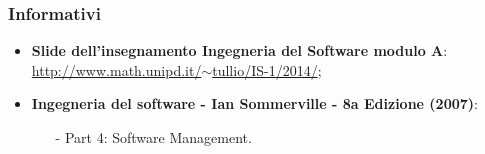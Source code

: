 \subsubsection{Informativi}
\begin{itemize}
	\item \textbf{Slide dell'insegnamento Ingegneria del Software modulo A}:\\ \href{http://www.math.unipd.it/~tullio/IS-1/2014/}{http://www.math.unipd.it/$\sim$tullio/IS-1/2014/};
	\item \textbf{Ingegneria del software - Ian Sommerville - 8a Edizione (2007)}:
		\begin{itemize}
		\item[-] Part 4: Software Management.
		\end{itemize}
\end{itemize}
